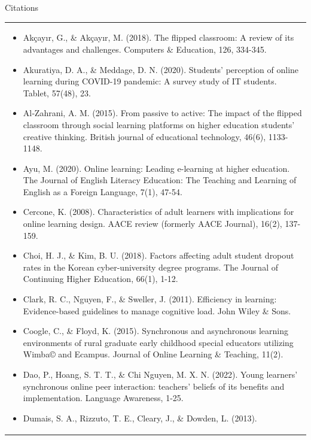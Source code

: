 \documentclass[
  ignorenonframetext,
]{beamer}
\begin{document}
\begin{frame}{Citations}
\label{citations}
\begin{longtable}[]{@{}
  >{\raggedright\arraybackslash}p{}@{}}
\toprule\noalign{}
\endhead
\begin{minipage}[t]{\linewidth}\raggedright
\begin{itemize}
\item
  Akçayır, G., \& Akçayır, M. (2018). The flipped classroom: A review of
  its advantages and challenges. Computers \& Education, 126, 334-345.
\item
  Akuratiya, D. A., \& Meddage, D. N. (2020). Students' perception of
  online learning during COVID-19 pandemic: A survey study of IT
  students. Tablet, 57(48), 23.
\item
  Al‐Zahrani, A. M. (2015). From passive to active: The impact of the
  flipped classroom through social learning platforms on higher
  education students' creative thinking. British journal of educational
  technology, 46(6), 1133-1148.
\item
  Ayu, M. (2020). Online learning: Leading e-learning at higher
  education. The Journal of English Literacy Education: The Teaching and
  Learning of English as a Foreign Language, 7(1), 47-54.
\item
  Cercone, K. (2008). Characteristics of adult learners with
  implications for online learning design. AACE review (formerly AACE
  Journal), 16(2), 137-159.
\item
  Choi, H. J., \& Kim, B. U. (2018). Factors affecting adult student
  dropout rates in the Korean cyber-university degree programs. The
  Journal of Continuing Higher Education, 66(1), 1-12.
\item
  Clark, R. C., Nguyen, F., \& Sweller, J. (2011). Efficiency in
  learning: Evidence-based guidelines to manage cognitive load. John
  Wiley \& Sons.
\item
  Coogle, C., \& Floyd, K. (2015). Synchronous and asynchronous learning
  environments of rural graduate early childhood special educators
  utilizing Wimba© and Ecampus. Journal of Online Learning \& Teaching,
  11(2).
\item
  Dao, P., Hoang, S. T. T., \& Chi Nguyen, M. X. N. (2022). Young
  learners' synchronous online peer interaction: teachers' beliefs of
  its benefits and implementation. Language Awareness, 1-25.
\item
  Dumais, S. A., Rizzuto, T. E., Cleary, J., \& Dowden, L. (2013).

\end{itemize}
\end{minipage}
\end{longtable}
\end{frame}
\end{document}

